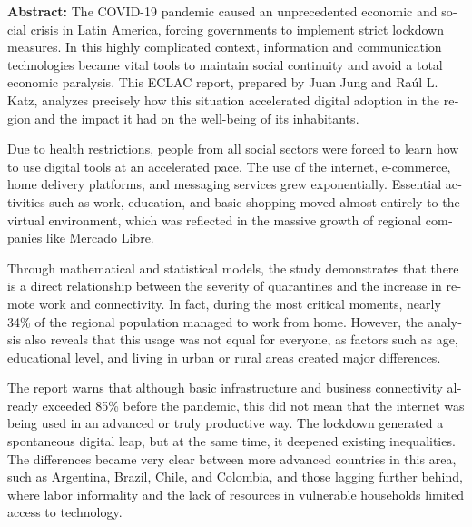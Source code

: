 \documentclass{article}
\begin{document}
\begin{tcolorbox}[colback=brown!8!white,colframe=brown!8!white,boxrule=0pt,arc=2pt,left=4pt,right=4pt,top=3pt,bottom=3pt,before skip=4pt,after skip=4pt]
\begin{otherlanguage}{english}
\sffamily\small \textbf{Abstract:} The COVID-19 pandemic caused an unprecedented economic and social crisis in Latin America, forcing governments to implement strict lockdown measures. In this highly complicated context, information and communication technologies became vital tools to maintain social continuity and avoid a total economic paralysis. This ECLAC report, prepared by Juan Jung and Raúl L. Katz, analyzes precisely how this situation accelerated digital adoption in the region and the impact it had on the well-being of its inhabitants.

Due to health restrictions, people from all social sectors were forced to learn how to use digital tools at an accelerated pace. The use of the internet, e-commerce, home delivery platforms, and messaging services grew exponentially. Essential activities such as work, education, and basic shopping moved almost entirely to the virtual environment, which was reflected in the massive growth of regional companies like Mercado Libre.

Through mathematical and statistical models, the study demonstrates that there is a direct relationship between the severity of quarantines and the increase in remote work and connectivity. In fact, during the most critical moments, nearly 34\% of the regional population managed to work from home. However, the analysis also reveals that this usage was not equal for everyone, as factors such as age, educational level, and living in urban or rural areas created major differences.

The report warns that although basic infrastructure and business connectivity already exceeded 85\% before the pandemic, this did not mean that the internet was being used in an advanced or truly productive way. The lockdown generated a spontaneous digital leap, but at the same time, it deepened existing inequalities. The differences became very clear between more advanced countries in this area, such as Argentina, Brazil, Chile, and Colombia, and those lagging further behind, where labor informality and the lack of resources in vulnerable households limited access to technology.


\end{otherlanguage}
\end{tcolorbox}
\end{document}
